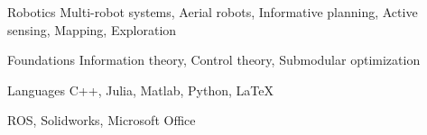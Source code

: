
\begin{cvskills}
  \cvskill
  {Robotics}
  {Multi-robot systems, Aerial robots, Informative planning, Active sensing,
  Mapping, Exploration}

  \cvskill
  {Foundations}
  {Information theory, Control theory, Submodular optimization}

  \cvskill
  {Languages}
  {C++, Julia, Matlab, Python, LaTeX}

  {ROS, Solidworks, Microsoft Office}
\end{cvskills}

